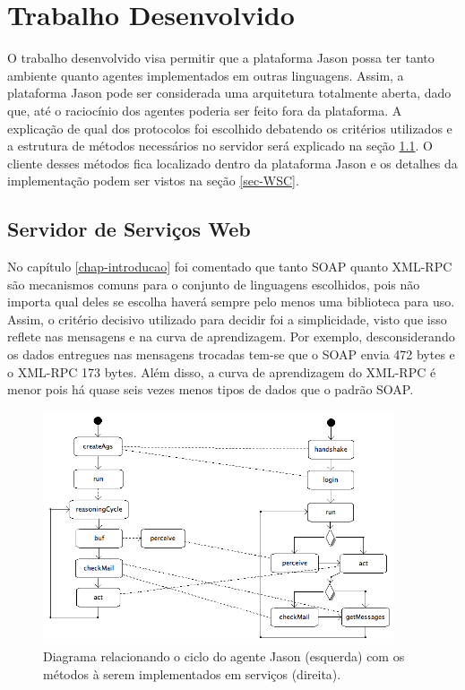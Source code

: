 \chapter{Trabalho Desenvolvido} \label{chap-desenvolvimentoWS}

O trabalho desenvolvido visa permitir que a plataforma Jason possa
ter tanto ambiente quanto agentes implementados em outras linguagens. Assim, a
plataforma Jason pode ser considerada uma arquitetura totalmente aberta, dado
que, até o raciocínio dos agentes poderia ser feito fora da plataforma.
A explicação de qual dos protocolos foi escolhido debatendo os critérios
utilizados e a estrutura de métodos necessários no servidor será explicado na
seção \ref{sec-WSS}. O cliente desses métodos fica localizado dentro da
plataforma Jason e os detalhes da implementação podem ser vistos na seção
\ref{sec-WSC}.

\section{Servidor de Serviços Web} \label{sec-WSS}

No capítulo \ref{chap-introducao} foi comentado que tanto SOAP quanto XML-RPC são
mecanismos comuns para o conjunto de linguagens escolhidos, pois não importa
qual deles se escolha haverá sempre pelo menos uma biblioteca para uso. Assim,
o critério decisivo utilizado para decidir foi a simplicidade, visto que
isso reflete nas mensagens e na curva de aprendizagem. Por exemplo,
desconsiderando os dados entregues nas mensagens trocadas tem-se que o SOAP
envia 472 bytes e o XML-RPC 173 bytes. Além disso, a curva de aprendizagem
do XML-RPC é menor pois há quase seis vezes menos tipos de dados que o
padrão SOAP.

\begin{figure}[h]
               \begin{center}
               \includegraphics[width=104mm]{figuras/implXR-ag-compare-cycle.png}
                \end{center}
                \caption{Diagrama relacionando o ciclo do agente Jason (esquerda) com os métodos à serem implementados em serviços (direita).}
                \label{fig-uml-ag-cycle}
\end{figure}


